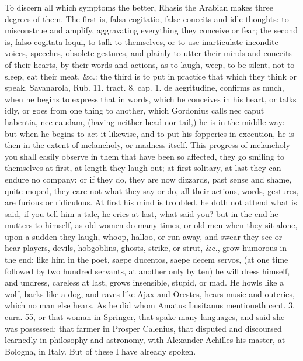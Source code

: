 {To discern all which symptoms the better, Rhasis the Arabian
makes three degrees of them. The first is, falsa cogitatio, false
conceits and idle thoughts: to misconstrue and amplify, aggravating
everything they conceive or fear; the second is, falso cogitata loqui,
to talk to themselves, or to use inarticulate incondite voices,
speeches, obsolete gestures, and plainly to utter their minds and
conceits of their hearts, by their words and actions, as to laugh,
weep, to be silent, not to sleep, eat their meat, \&c.: the third is to
put in practice that which they think or speak. Savanarola, Rub.
11. tract. 8. cap. 1. de aegritudine, confirms as much, when he
begins to express that in words, which he conceives in his heart, or
talks idly, or goes from one thing to another, which Gordonius
calls nec caput habentia, nec caudam, (having neither head nor tail,)
he is in the middle way:  but when he begins to act it likewise,
and to put his fopperies in execution, he is then in the extent of
melancholy, or madness itself. This progress of melancholy you shall
easily observe in them that have been so affected, they go smiling to
themselves at first, at length they laugh out; at first solitary, at
last they can endure no company: or if they do, they are now dizzards,
past sense and shame, quite moped, they care not what they say or do,
all their actions, words, gestures, are furious or ridiculous. At first
his mind is troubled, he doth not attend what is said, if you tell him
a tale, he cries at last, what said you? but in the end he mutters to
himself, as old women do many times, or old men when they sit alone,
upon a sudden they laugh, whoop, halloo, or run away, and swear they
see or hear players, devils, hobgoblins, ghosts, strike, or
strut, \&c., grow humorous in the end; like him in the poet, saepe
ducentos, saepe decem servos, (at one time followed by two hundred
servants, at another only by ten) he will dress himself, and undress,
careless at last, grows insensible, stupid, or mad. He howls like
a wolf, barks like a dog, and raves like Ajax and Orestes, hears music
and outcries, which no man else hears. As he did whom Amatus
Lusitanus mentioneth cent. 3, cura. 55, or that woman in
Springer, that spake many languages, and said she was possessed:
that farmer in Prosper Calenius, that disputed and discoursed
learnedly in philosophy and astronomy, with Alexander Achilles his
master, at Bologna, in Italy. But of these I have already spoken.

}
